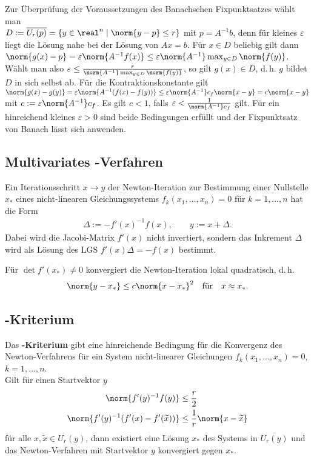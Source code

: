 Zur Überprüfung der Voraussetzungen des Banachschen Fixpunktsatzes wählt man \\
$D := \overline{U_r(p)} = \{y \in \real^n \;|\; \norm{y - p} \le r\}$
mit $p = A^{-1} b$, denn für kleines $\varepsilon$ liegt die Lösung
nahe bei der Lösung von $Ax = b$.
Für $x \in D$ beliebig gilt dann
$\norm{g(x) - p} = \varepsilon \norm{A^{-1} f(x)} \le
\varepsilon \norm{A^{-1}} \max_{y \in D} \norm{f(y)}$.
Wählt man also
$\varepsilon \le \frac{r}{\norm{A^{-1}} \max_{y \in D} \norm{f(y)}}$,
so gilt $g(x) \in D$, d.\,h. $g$ bildet $D$ in sich selbst ab.
Für die Kontraktionskonstante gilt
$\norm{g(x) - g(y)} = \varepsilon \norm{A^{-1} (f(x) - f(y))} \le
\varepsilon \norm{A^{-1}} c_f \norm{x - y} = c \norm{x - y}$
mit $c := \varepsilon \norm{A^{-1}} c_f$.
Es gilt $c < 1$, falls $\varepsilon < \frac{1}{\norm{A^{-1}} c_f}$ gilt.
Für ein hinreichend kleines $\varepsilon > 0$ sind beide Bedingungen
erfüllt und der Fixpunktsatz von Banach lässt sich anwenden.

\subsection{%
    Multivariates -Verfahren%
}

Ein Iterationsschritt $x \rightarrow y$ der Newton-Iteration zur Bestimmung
einer Nullstelle $x_\ast$ eines nicht-linearen Gleichungssystems
$f_k(x_1, \dotsc, x_n) = 0$ für $k = 1, \dotsc, n$ hat die Form
\begin{align*}
    \Delta := -f'(x)^{-1} f(x), \qquad
    y := x + \Delta.
\end{align*}
Dabei wird die Jacobi-Matrix $f'(x)$ nicht invertiert, sondern das Inkrement
$\Delta$ wird als Lösung des LGS $f'(x) \Delta = -f(x)$ bestimmt.

Für $\det f'(x_\ast) \not= 0$ konvergiert die Newton-Iteration lokal
quadratisch, d.\,h.
\begin{align*}
    \norm{y - x_\ast} \le c \norm{x - x_\ast}^2 \quad\text{für}\quad
    x \approx x_\ast.
\end{align*}

\subsection{%
    -Kriterium%
}

Das \textbf{-Kriterium} gibt eine hinreichende Bedingung
für die Konvergenz des Newton-Verfahrens für ein System nicht-linearer
Gleichungen $f_k(x_1, \dotsc, x_n) = 0$, $k = 1, \dotsc, n$. \\
Gilt für einen Startvektor $y$
\begin{align*}
    \norm{f'(y)^{-1} f(y)} & \le \frac{r}{2} \\
    \norm{f'(y)^{-1} (f'(x) - f'(\widetilde{x}))} &
    \le \frac{1}{r} \norm{x - \widetilde{x}}
\end{align*}
für alle $x, \widetilde{x} \in U_r(y)$, dann existiert eine Lösung $x_\ast$
des Systems in $\overline{U_r(y)}$ und das Newton-Verfahren mit Startvektor $y$
konvergiert gegen $x_\ast$.

